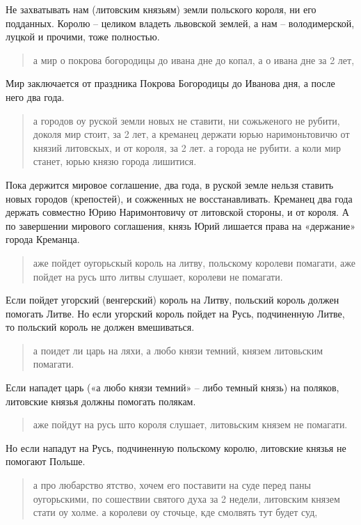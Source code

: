Не захватывать нам (литовским князьям) земли польского короля, ни его подданных. Королю – целиком владеть львовской землей, а нам – володимерской, луцкой и прочими, тоже полностью.

\begin{quotation}
а мир о покрова богородицы до ивана дне до копал, а о ивана дне за 2 лет,
\end{quotation}

Мир заключается от праздника Покрова Богородицы до Иванова дня, а после него два года.

\begin{quotation}
а городов оу руской земли новых не ставити, ни сожьженого не рубити, доколя мир стоит, за 2 лет, а креманец держати юрью наримоньтовичю от князий литовскых, и от короля, за 2 лет. а города не рубити. а коли мир станет, юрью князю города лишитися.
\end{quotation}

Пока держится мировое соглашение, два года, в руской земле нельзя ставить новых городов (крепостей), и сожженных не восстанавливать. Креманец два года держать совместно Юрию Наримонтовичу от литовской стороны, и от короля. А по завершении мирового соглашения, князь Юрий лишается права на «держание» города Креманца.

\begin{quotation}
аже пойдет оугорьскый король на литву, польскому королеви помагати, аже пойдет на русь што литвы слушает, королеви не помагати.
\end{quotation}

Если пойдет угорский (венгерский) король на Литву, польский король должен помогать Литве. Но если угорский король пойдет на Русь, подчиненную Литве, то польский король не должен вмешиваться.

\begin{quotation}
а поидет ли царь на ляхи, а любо князи темний, князем литовьским помагати.
\end{quotation}

Если нападет царь («а любо князи темний» – либо темный князь) на поляков, литовские князья должны помогать полякам.

\begin{quotation}
аже пойдут на русь што короля слушает, литовьским князем не помагати.
\end{quotation}

Но если нападут на Русь, подчиненную польскому королю, литовские князья не помогают Польше.

\begin{quotation}
а про любарство ятство, хочем его поставити на суде перед паны оугорьскими, по сошествии святого духа за 2 недели, литовским князем стати оу холме. а королеви оу сточьце, кде смолвять тут будет суд,\end{quotation}

